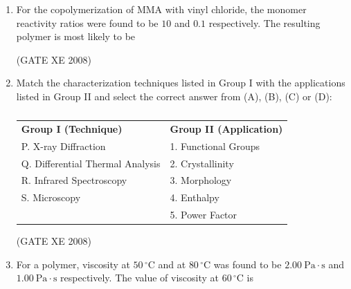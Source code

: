 \documentclass[12pt]{article}
\begin{document}
\begin{enumerate}
(GATE XE 2008)

\item For the copolymerization of MMA with vinyl chloride, the monomer reactivity ratios were found to be $10$ and $0.1$ respectively. The resulting polymer is most likely to be 

\begin{enumerate}
\end{enumerate}

 (GATE XE 2008)

\item Match the characterization techniques listed in Group I with the applications listed in Group II and select the correct answer from (A), (B), (C) or (D):

\begin{table}[H]     \centering     \caption{}     \label{}     \begin{tabular}{ll}
\textbf{Group I (Technique)} & \textbf{Group II (Application)} \\
P. X-ray Diffraction & 1. Functional Groups \\
Q. Differential Thermal Analysis & 2. Crystallinity \\
R. Infrared Spectroscopy & 3. Morphology \\
S. Microscopy & 4. Enthalpy \\
 & 5. Power Factor \\
\end{tabular} \end{table}

\begin{enumerate}
\end{enumerate}

(GATE XE 2008)

\item For a polymer, viscosity at $50\,^{\circ}\mathrm{C}$ and at $80\,^{\circ}\mathrm{C}$ was found to be $2.00~\mathrm{Pa\cdot s}$ and $1.00~\mathrm{Pa\cdot s}$ respectively. The value of viscosity at $60\,^{\circ}\mathrm{C}$ is  


\end{enumerate}
\end{document}
